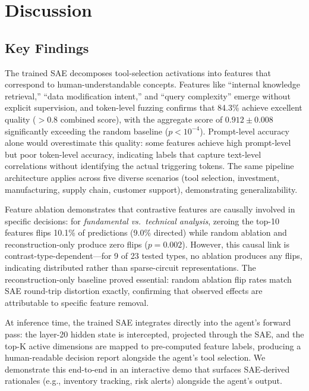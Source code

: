 \documentclass[runningheads]{llncs}
\begin{document}
\section{Discussion}
\label{sec:discussion}

\subsection{Key Findings}

The trained SAE decomposes tool-selection activations into features that correspond to human-understandable concepts. Features like ``internal knowledge retrieval,'' ``data modification intent,'' and ``query complexity'' emerge without explicit supervision, and token-level fuzzing confirms that 84.3\% achieve excellent quality ($> 0.8$ combined score), with the aggregate score of $0.912 \pm 0.008$ significantly exceeding the random baseline ($p < 10^{-4}$). Prompt-level accuracy alone would overestimate this quality: some features achieve high prompt-level but poor token-level accuracy, indicating labels that capture text-level correlations without identifying the actual triggering tokens. The same pipeline architecture applies across five diverse scenarios (tool selection, investment, manufacturing, supply chain, customer support), demonstrating generalizability.

Feature ablation demonstrates that contrastive features are causally involved in specific decisions: for \emph{fundamental vs.\ technical analysis}, zeroing the top-10 features flips 10.1\% of predictions (9.0\% directed) while random ablation and reconstruction-only produce zero flips ($p = 0.002$). However, this causal link is contrast-type-dependent---for 9 of 23 tested types, no ablation produces any flips, indicating distributed rather than sparse-circuit representations. The reconstruction-only baseline proved essential: random ablation flip rates match SAE round-trip distortion exactly, confirming that observed effects are attributable to specific feature removal.

At inference time, the trained SAE integrates directly into the agent's forward pass: the layer-20 hidden state is intercepted, projected through the SAE, and the top-K active dimensions are mapped to pre-computed feature labels, producing a human-readable decision report alongside the agent's tool selection. We demonstrate this end-to-end in an interactive demo that surfaces SAE-derived rationales (e.g., inventory tracking, risk alerts) alongside the agent's output.
\end{document}
